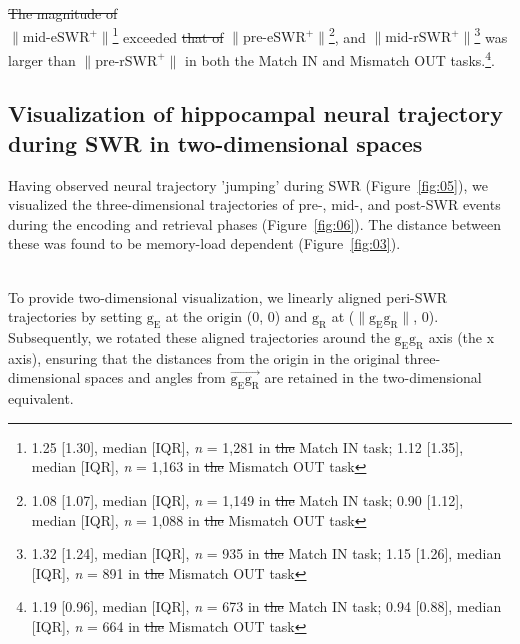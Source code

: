 \documentclass[final,3p,times,twocolumn]{elsarticle}
\providecommand{\DIFaddtex}[1]{{\protect\color{blue}\uwave{#1}}} %
\providecommand{\DIFdeltex}[1]{{\protect\color{red}\sout{#1}}}                      %
\providecommand{\DIFaddbegin}{} %
\providecommand{\DIFaddend}{} %
\providecommand{\DIFdelbegin}{} %
\providecommand{\DIFdelend}{} %
\providecommand{\DIFadd}[1]{\texorpdfstring{\DIFaddtex{#1}}{#1}} %
\providecommand{\DIFdel}[1]{\texorpdfstring{\DIFdeltex{#1}}{}} %
\newcommand{\DIFscaledelfig}{0.5}
\newlength{\DIFdelgraphicswidth} %
\newlength{\DIFdelgraphicsheight} %
\newcommand{\DIFaddincludegraphics}[2][]{{\color{blue}\fbox{\DIFOincludegraphics[#1]{#2}}}} %
\newcommand{\DIFdelincludegraphics}[2][]{%
\sbox{\DIFdelgraphicsbox}{\DIFOincludegraphics[#1]{#2}}%
\settoboxwidth{\DIFdelgraphicswidth}{\DIFdelgraphicsbox} %
\settoboxtotalheight{\DIFdelgraphicsheight}{\DIFdelgraphicsbox} %
\scalebox{\DIFscaledelfig}{%
\parbox[b]{\DIFdelgraphicswidth}{\usebox{\DIFdelgraphicsbox}\\[-\baselineskip] \rule{\DIFdelgraphicswidth}{0em}}\llap{\resizebox{\DIFdelgraphicswidth}{\DIFdelgraphicsheight}{%
\setlength{\unitlength}{\DIFdelgraphicswidth}%
\begin{picture}(1,1)%
\thicklines\linethickness{2pt} %
{\color[rgb]{1,0,0}\put(0,0){\framebox(1,1){}}}%
{\color[rgb]{1,0,0}\put(0,0){\line( 1,1){1}}}%
{\color[rgb]{1,0,0}\put(0,1){\line(1,-1){1}}}%
\end{picture}%
}\hspace*{3pt}}} %
} %
\DeclareRobustCommand{\DIFaddbegin}{\DIFOaddbegin \let\includegraphics\DIFaddincludegraphics} %
\DeclareRobustCommand{\DIFaddend}{\DIFOaddend \let\includegraphics\DIFOincludegraphics} %
\DeclareRobustCommand{\DIFdelbegin}{\DIFOdelbegin \let\includegraphics\DIFdelincludegraphics} %
\DeclareRobustCommand{\DIFdelend}{\DIFOaddend \let\includegraphics\DIFOincludegraphics} %
\begin{document}
\DIFdel{The magnitude of }\DIFdelend \DIFaddbegin \\
\indent
\DIFadd{As a result, }\DIFaddend $\mathrm{\lVert \text{mid-eSWR}^+ \rVert}$\footnote{1.25 [1.30], median [IQR], \textit{n} = 1,281 in \DIFdelbegin \DIFdel{the }\DIFdelend Match IN task; 1.12 [1.35], median [IQR], \textit{n} = 1,163 in \DIFdelbegin \DIFdel{the }\DIFdelend Mismatch OUT task} exceeded \DIFdelbegin \DIFdel{that of }\DIFdelend $\mathrm{\lVert \text{pre-eSWR}^+ \rVert}$\footnote{1.08 [1.07], median [IQR], \textit{n} = 1,149 in \DIFdelbegin \DIFdel{the }\DIFdelend Match IN task; 0.90 [1.12], median [IQR], \textit{n} = 1,088 in \DIFdelbegin \DIFdel{the }\DIFdelend Mismatch OUT task}, and $\mathrm{\lVert \text{mid-rSWR}^+ \rVert}$\footnote{1.32 [1.24], median [IQR], \textit{n} = 935 in \DIFdelbegin \DIFdel{the }\DIFdelend Match IN task; 1.15 [1.26], median [IQR], \textit{n} = 891 in \DIFdelbegin \DIFdel{the }\DIFdelend Mismatch OUT task} was larger than $\mathrm{\lVert \text{pre-rSWR}^+ \rVert}$ in both the Match IN and Mismatch OUT tasks.\footnote{1.19 [0.96], median [IQR], \textit{n} = 673 in \DIFdelbegin \DIFdel{the }\DIFdelend Match IN task; 0.94 [0.88], median [IQR], \textit{n} = 664 in \DIFdelbegin \DIFdel{the }\DIFdelend Mismatch OUT task}.

\subsection{Visualization of hippocampal neural trajectory during SWR in two-dimensional spaces}
Having observed neural trajectory 'jumping' during SWR (Figure~\ref{fig:05}), we visualized the three-dimensional trajectories of pre-, mid-, and post-SWR events during the encoding and retrieval phases (Figure~\ref{fig:06}). The distance between these was found to be memory-load dependent (Figure~\ref{fig:03}). 
\DIFdelbegin %

\DIFdelend \DIFaddbegin \\
\indent
\DIFaddend To provide two-dimensional visualization, we linearly aligned peri-SWR trajectories by setting $\mathrm{g_{E}}$ at the origin (0, 0) and $\mathrm{g_{R}}$ at ($\mathrm{\lVert g_{E}g_{R} \rVert}$, 0). Subsequently, we rotated these aligned trajectories around the $\mathrm{g_{E}g_{R}}$ axis (the x axis), ensuring that the distances from the origin in the original three-dimensional spaces and angles from $\overrightarrow{\mathrm{g_{E}g_{R}}}$ are retained in the two-dimensional equivalent.
\DIFdelbegin %
\end{document}
